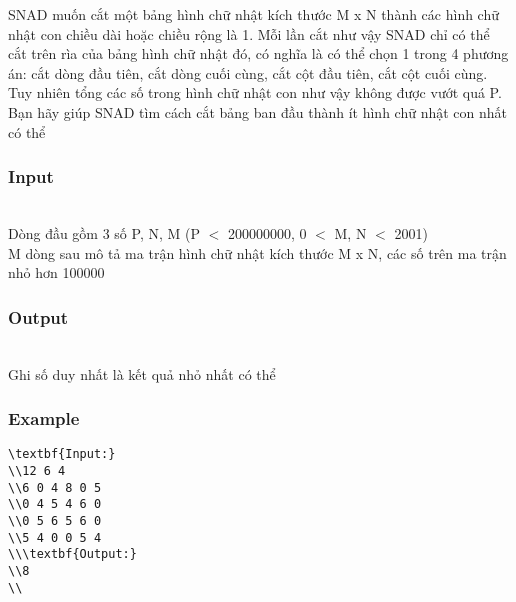 



   SNAD muốn cắt một bảng hình chữ nhật kích thước M x N thành các hình chữ nhật con chiều dài hoặc chiều rộng là 1. Mỗi lần cắt như vậy SNAD chỉ có thể cắt trên rìa của bảng hình chữ nhật đó, có nghĩa là có thể chọn 1 trong 4 phương án: cắt dòng đầu tiên, cắt dòng cuối cùng, cắt cột đầu tiên, cắt cột cuối cùng. Tuy nhiên tổng các số trong hình chữ nhật con như vậy không được vướt quá P. Bạn hãy giúp SNAD tìm cách cắt bảng ban đầu thành ít hình chữ nhật con nhất có thể  

\subsubsection{   Input  }


\\   Dòng đầu gồm 3 số P, N, M (P $<$ 200000000, 0 $<$ M, N $<$ 2001)   
\\   M dòng sau mô tả ma trận hình chữ nhật kích thước M x N, các số trên ma trận nhỏ hơn 100000  

\subsubsection{   Output  }


\\   Ghi số duy nhất là kết quả nhỏ nhất có thể  

\subsubsection{   Example  }
\begin{verbatim}
\textbf{Input:}
\\12 6 4
\\6 0 4 8 0 5
\\0 4 5 4 6 0
\\0 5 6 5 6 0
\\5 4 0 0 5 4
\\\textbf{Output:}
\\8
\\\end{verbatim}